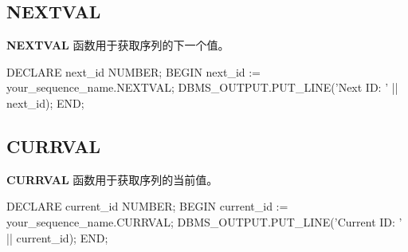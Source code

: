 \documentclass[11pt, a4paper, oneside, UTF8]{ctexbook}
\let\kaishu\relax %
\begin{document}
\subsection{NEXTVAL}
{\bfseries\kaishu NEXTVAL }函数用于获取序列的下一个值。
\begin{plsql}[caption=NEXTVAL示例代码]
DECLARE
  next_id NUMBER;
BEGIN
  next_id := your_sequence_name.NEXTVAL;
  DBMS_OUTPUT.PUT_LINE('Next ID: ' || next_id);
END;
\end{plsql}
\subsection{CURRVAL}
{\bfseries\kaishu CURRVAL} 函数用于获取序列的当前值。
\begin{plsql}[caption=CURRVAL示例代码]
DECLARE
  current_id NUMBER;
BEGIN
  current_id := your_sequence_name.CURRVAL;
  DBMS_OUTPUT.PUT_LINE('Current ID: ' || current_id);
END;
\end{plsql}

\end{document}
